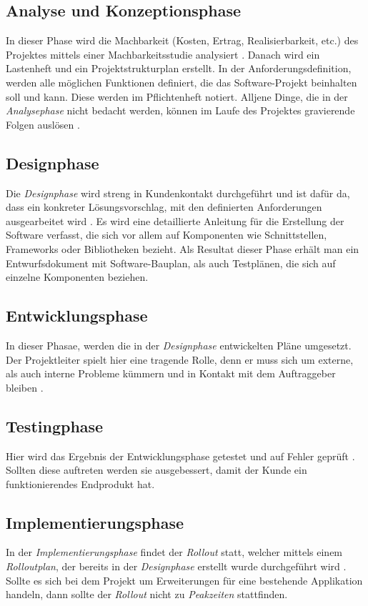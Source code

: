 \subsection{Analyse und Konzeptionsphase}
In dieser Phase wird die Machbarkeit (Kosten, Ertrag, Realisierbarkeit, etc.) des Projektes mittels einer Machbarkeitsstudie analysiert \cite{pm-wasserfall-ionos}. Danach wird ein Lastenheft und ein Projektstrukturplan erstellt. In der Anforderungsdefinition, werden alle möglichen Funktionen definiert, die das Software-Projekt beinhalten soll und kann. Diese werden im Pflichtenheft notiert. Alljene Dinge, die in der \textit{Analysephase} nicht bedacht werden, können im Laufe des Projektes gravierende Folgen auslösen \cite{pm-wasserfall-online}.
\subsection{Designphase}
Die \textit{Designphase} wird streng in Kundenkontakt durchgeführt \cite{pm-wasserfall-online} und ist dafür da, dass ein konkreter Lösungsvorschlag, mit den definierten Anforderungen ausgearbeitet wird \cite{pm-wasserfall-ionos}. Es wird eine detaillierte Anleitung für die Erstellung der Software verfasst, die sich vor allem auf Komponenten wie Schnittstellen, Frameworks oder Bibliotheken bezieht. Als Resultat dieser Phase erhält man ein Entwurfsdokument mit Software-Bauplan, als auch Testplänen, die sich auf einzelne Komponenten beziehen.
\subsection{Entwicklungsphase}
In dieser Phasae, werden die in der \textit{Designphase} entwickelten Pläne umgesetzt. Der Projektleiter spielt hier eine tragende Rolle, denn er muss sich um externe, als auch interne Probleme kümmern und in Kontakt mit dem Auftraggeber bleiben \cite{pm-wasserfall-online}. 
\subsection{Testingphase}
Hier wird das Ergebnis der Entwicklungsphase getestet und auf Fehler geprüft \cite{pm-wasserfall-online}. Sollten diese auftreten werden sie ausgebessert, damit der Kunde ein funktionierendes Endprodukt hat.
\subsection{Implementierungsphase}
In der \textit{Implementierungsphase} findet der \textit{Rollout} statt, welcher mittels einem \textit{Rolloutplan}, der bereits in der \textit{Designphase} erstellt wurde durchgeführt wird \cite{pm-wasserfall-online}. Sollte es sich bei dem Projekt um Erweiterungen für eine bestehende Applikation handeln, dann sollte der \textit{Rollout} nicht zu \textit{Peakzeiten} stattfinden.
